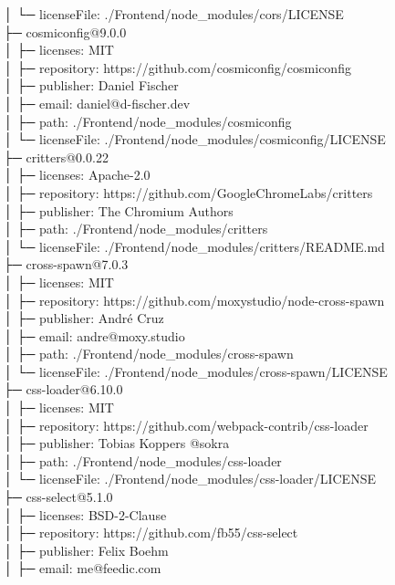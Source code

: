 │  └─ licenseFile: ./Frontend/node\_modules/cors/LICENSE\\
├─ cosmiconfig@9.0.0\\
│  ├─ licenses: MIT\\
│  ├─ repository: https://github.com/cosmiconfig/cosmiconfig\\
│  ├─ publisher: Daniel Fischer\\
│  ├─ email: daniel@d-fischer.dev\\
│  ├─ path: ./Frontend/node\_modules/cosmiconfig\\
│  └─ licenseFile: ./Frontend/node\_modules/cosmiconfig/LICENSE\\
├─ critters@0.0.22\\
│  ├─ licenses: Apache-2.0\\
│  ├─ repository: https://github.com/GoogleChromeLabs/critters\\
│  ├─ publisher: The Chromium Authors\\
│  ├─ path: ./Frontend/node\_modules/critters\\
│  └─ licenseFile: ./Frontend/node\_modules/critters/README.md\\
├─ cross-spawn@7.0.3\\
│  ├─ licenses: MIT\\
│  ├─ repository: https://github.com/moxystudio/node-cross-spawn\\
│  ├─ publisher: André Cruz\\
│  ├─ email: andre@moxy.studio\\
│  ├─ path: ./Frontend/node\_modules/cross-spawn\\
│  └─ licenseFile: ./Frontend/node\_modules/cross-spawn/LICENSE\\
├─ css-loader@6.10.0\\
│  ├─ licenses: MIT\\
│  ├─ repository: https://github.com/webpack-contrib/css-loader\\
│  ├─ publisher: Tobias Koppers @sokra\\
│  ├─ path: ./Frontend/node\_modules/css-loader\\
│  └─ licenseFile: ./Frontend/node\_modules/css-loader/LICENSE\\
├─ css-select@5.1.0\\
│  ├─ licenses: BSD-2-Clause\\
│  ├─ repository: https://github.com/fb55/css-select\\
│  ├─ publisher: Felix Boehm\\
│  ├─ email: me@feedic.com\\
